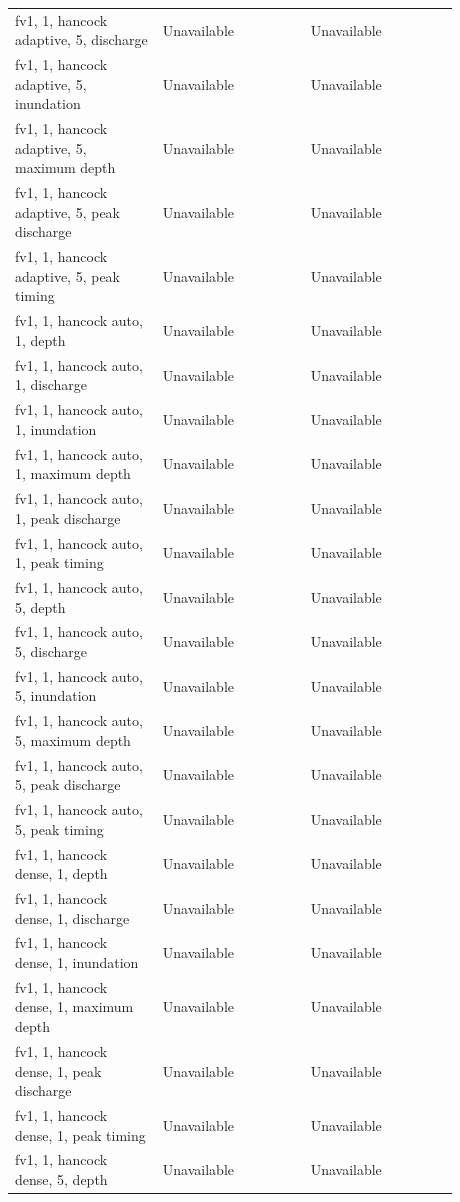 \begin{longtable}{p{0.2933\linewidth}p{0.2933\linewidth}p{0.2933\linewidth}}
fv1, 1, hancock adaptive, 5, discharge & Unavailable & Unavailable \\
fv1, 1, hancock adaptive, 5, inundation & Unavailable & Unavailable \\
fv1, 1, hancock adaptive, 5, maximum depth & Unavailable & Unavailable \\
fv1, 1, hancock adaptive, 5, peak discharge & Unavailable & Unavailable \\
fv1, 1, hancock adaptive, 5, peak timing & Unavailable & Unavailable \\
fv1, 1, hancock auto, 1, depth & Unavailable & Unavailable \\
fv1, 1, hancock auto, 1, discharge & Unavailable & Unavailable \\
fv1, 1, hancock auto, 1, inundation & Unavailable & Unavailable \\
fv1, 1, hancock auto, 1, maximum depth & Unavailable & Unavailable \\
fv1, 1, hancock auto, 1, peak discharge & Unavailable & Unavailable \\
fv1, 1, hancock auto, 1, peak timing & Unavailable & Unavailable \\
fv1, 1, hancock auto, 5, depth & Unavailable & Unavailable \\
fv1, 1, hancock auto, 5, discharge & Unavailable & Unavailable \\
fv1, 1, hancock auto, 5, inundation & Unavailable & Unavailable \\
fv1, 1, hancock auto, 5, maximum depth & Unavailable & Unavailable \\
fv1, 1, hancock auto, 5, peak discharge & Unavailable & Unavailable \\
fv1, 1, hancock auto, 5, peak timing & Unavailable & Unavailable \\
fv1, 1, hancock dense, 1, depth & Unavailable & Unavailable \\
fv1, 1, hancock dense, 1, discharge & Unavailable & Unavailable \\
fv1, 1, hancock dense, 1, inundation & Unavailable & Unavailable \\
fv1, 1, hancock dense, 1, maximum depth & Unavailable & Unavailable \\
fv1, 1, hancock dense, 1, peak discharge & Unavailable & Unavailable \\
fv1, 1, hancock dense, 1, peak timing & Unavailable & Unavailable \\
fv1, 1, hancock dense, 5, depth & Unavailable & Unavailable \\

\end{longtable}
